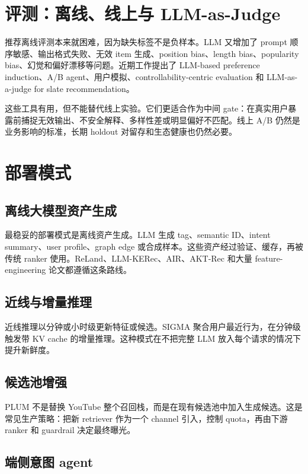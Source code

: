 \documentclass[UTF8,fontset=fandol,11pt]{ctexart}
\begin{document}
\section{评测：离线、线上与 LLM-as-Judge}

推荐离线评测本来就困难，因为缺失标签不是负样本。LLM 又增加了 prompt 顺序敏感、输出格式失败、无效 item 生成、position bias、length bias、popularity bias、幻觉和偏好漂移等问题。近期工作提出了 LLM-based preference induction、A/B agent、用户模拟、controllability-centric evaluation 和 LLM-as-a-judge for slate recommendation。

这些工具有用，但不能替代线上实验。它们更适合作为中间 gate：在真实用户暴露前捕捉无效输出、不安全解释、多样性差或明显偏好不匹配。线上 A/B 仍然是业务影响的标准，长期 holdout 对留存和生态健康也仍然必要。

\section{部署模式}

\subsection{离线大模型资产生成}

最稳妥的部署模式是离线资产生成。LLM 生成 tag、semantic ID、intent summary、user profile、graph edge 或合成样本。这些资产经过验证、缓存，再被传统 ranker 使用。ReLand、LLM-KERec、AIR、AKT-Rec 和大量 feature-engineering 论文都遵循这条路线。

\subsection{近线与增量推理}

近线推理以分钟或小时级更新特征或候选。SIGMA 聚合用户最近行为，在分钟级触发带 KV cache 的增量推理。这种模式在不把完整 LLM 放入每个请求的情况下提升新鲜度。

\subsection{候选池增强}

PLUM 不是替换 YouTube 整个召回栈，而是在现有候选池中加入生成候选。这是常见生产策略：把新 retriever 作为一个 channel 引入，控制 quota，再由下游 ranker 和 guardrail 决定最终曝光。

\subsection{端侧意图 agent}
\end{document}
